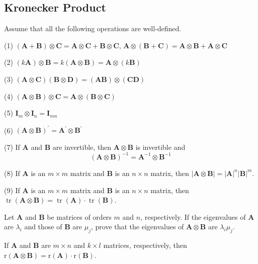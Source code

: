 \documentclass[12pt, a4paper, oneside]{book}
\begin{document}
\subsection{Kronecker Product}
\begin{definition}

\end{definition}
\begin{proposition}
    Assume that all the following operations are well-defined.

    (1) $(\mathbf{A}+\mathbf{B}) \otimes \mathbf{C}=\mathbf{A} \otimes \mathbf{C}+\mathbf{B} \otimes \mathbf{C}$,
    $\mathbf{A} \otimes(\mathbf{B}+\mathbf{C})=\mathbf{A} \otimes \mathbf{B}+\mathbf{A} \otimes \mathbf{C}$

    (2) $(k \mathbf{A}) \otimes \mathbf{B}=k(\mathbf{A} \otimes \mathbf{B})=\mathbf{A} \otimes(k \mathbf{B})$

    (3) $(\mathbf{A} \otimes \mathbf{C})(\mathbf{B} \otimes \mathbf{D})=({\mathbf{A} \mathbf{B}}) \otimes({\mathbf{C} \mathbf{D}})$

    (4) $(\mathbf{A} \otimes \mathbf{B}) \otimes \mathbf{C}=\mathbf{A} \otimes(\mathbf{B} \otimes \mathbf{C})$

    (5) $\mathbf{I}_m \otimes \mathbf{I}_n=\mathbf{I}_{m n}$

    (6) $(\mathbf{A} \otimes \mathbf{B})^{\prime}=\mathbf{A}^{\prime} \otimes \mathbf{B}^{\prime}$

    (7) If $\mathbf{A}$ and $\mathbf{B}$ are invertible, then $\mathbf{A} \otimes \mathbf{B}$ is invertible and
    \[
        (\mathbf{A} \otimes \mathbf{B})^{-1}=\mathbf{A}^{-1} \otimes \mathbf{B}^{-1}
    \]

    (8) If $\mathbf{A}$ is an $m \times m$ matrix and $\mathbf{B}$ is an $n \times n$ matrix, then $|\mathbf{A} \otimes \mathbf{B}|=|\mathbf{A}|^n|\mathbf{B}|^m$.

    (9) If $\mathbf{A}$ is an $m \times m$ matrix and $\mathbf{B}$ is an $n \times n$ matrix, then $\operatorname{tr}(\mathbf{A} \otimes \mathbf{B})=\operatorname{tr}(\mathbf{A}) \cdot \operatorname{tr}(\mathbf{B})$.
\end{proposition}
\begin{proposition}
    Let $\mathbf{A}$ and $\mathbf{B}$ be matrices of orders $m$ and $n$, respectively. If the eigenvalues of $\mathbf{A}$ are $\lambda_i$ and those of $\mathbf{B}$ are $\mu_j$, prove that the eigenvalues of $\mathbf{A} \otimes \mathbf{B}$ are $\lambda_i \mu_j$.
\end{proposition}
\begin{proposition}
    If $\mathbf{A}$ and $\mathbf{B}$ are $m \times n$ and $k \times l$ matrices, respectively, then $\mathrm{r}(\mathbf{A} \otimes \mathbf{B})=\mathrm{r}(\mathbf{A}) \cdot \mathrm{r}(\mathbf{B})$.
\end{proposition}
\end{document}
